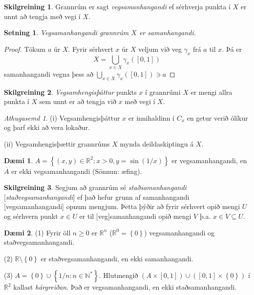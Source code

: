 \documentclass[a4paper,icelandic]{book}
\theoremstyle{definition}
\newtheorem{skilgr}{Skilgreining}[section]
\newtheorem{daemi}{Dæmi}[section]
\theoremstyle{plain}
\newtheorem{setn}{Setning}[section]
\theoremstyle{remark}
\newtheorem*{ath}{Athugasemd}
\newcommand{\R}{\mathbb{R}} %
\newcommand{\N}{\mathbb{N}} %
\begin{document}
\begin{skilgr}
  Grannrúm er sagt \emph{vegsamanhangandi} ef sérhverja
  punkta í $X$ er unnt að tengja með vegi í $X$.
\end{skilgr}
\begin{setn}
  Vegsamanhangandi grannrúm $X$ er samanhangandi.
\end{setn}
\begin{proof}
  Tökum $a$ úr $X$. Fyrir sérhvert $x$ úr $X$ veljum við veg $\gamma_x$ frá $a$
  til $x$. Þá er\[
  X = \bigcup_{x\in X}\gamma_x(\left[ 0,1 \right])
  \]
  samanhangandi vegna þess að $\bigcup_{x\in X}\gamma_x(\left[ 0,1 \right])\ni
  a$
\end{proof}
\begin{skilgr}
  \emph{Vegsamhengisþáttur} punkts $x$ í grannrúmi $X$
  er mengi allra punkta í $X$ sem unnt er að tengja við $x$ með vegi í $X$.
\end{skilgr}
\begin{ath}
  (i) Vegsamhengisþáttur $x$ er innihaldinn í $C_x$ en getur verið ólíkur og
  þarf ekki að vera lokaður.

  (ii) Vegsamhengisþættir grannrúms $X$ mynda deildaskiptingu á $X$.
\end{ath}
\begin{daemi}
  $A = \left\{ (x,y)\in\R^2 : x>0, y=\sin(1/x) \right\}$ er vegsamanhangandi, en
  $\overline A$ er ekki vegsamanhangandi (Sönnun: æfing).
\end{daemi}
\begin{skilgr}
  Segjum að grannrúm sé \emph{staðsamanhangandi}
  [\emph{staðvegsamanhangandi}]
  ef það hefur grunn af samanhangandi [vegsamanhangandi] opnum mengjum.
  Þetta þýðir að fyrir sérhvert opið mengi $U$ og sérhvern punkt $x\in U$ er til
  [veg]samanhangandi opið mengi $V$ þ.a. $x\in V\subseteq U$.
\end{skilgr}
\begin{daemi}
  (1) Fyrir öll $n\geq 0$ er $\R^n$ ($\R^0 = \left\{ 0 \right\}$)
  vegsamanhangandi og staðvegsamanhangandi.

  (2) $\R\setminus\left\{ 0 \right\}$ er staðvegsamanhangandi, en ekki
  samanhangandi.

  (3) $A = \left\{ 0 \right\}\cup\left\{ 1/n:n\in\N^* \right\}$. Hlutmengið
  $(A\times \left[ 0,1 \right])\cup(\left[ 0,1 \right]\times\left\{ 0
  \right\})$ í $\R^2$ kallast \emph{hárgreiðan}. Það er
  vegsamanhangandi, en ekki staðsamanhangandi.
\end{daemi}
\end{document}
